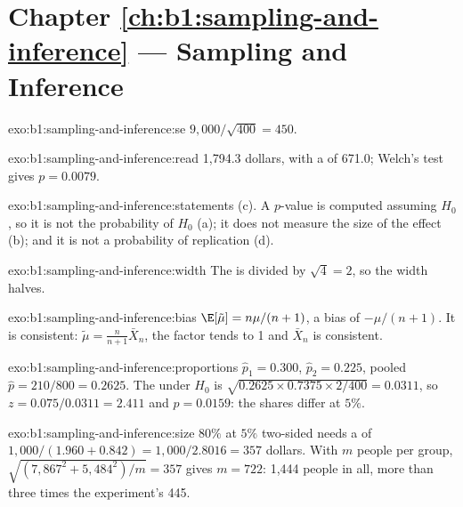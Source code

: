 \section*{Chapter \ref{ch:b1:sampling-and-inference} --- Sampling and Inference}

\begin{solution}{exo:b1:sampling-and-inference:se}
$9{,}000/\sqrt{400} = 450$.
\end{solution}

\begin{solution}{exo:b1:sampling-and-inference:read}
1,794.3 dollars, with a  of 671.0; Welch's test gives $p = 0.0079$.
\end{solution}

\begin{solution}{exo:b1:sampling-and-inference:statements}
(c). A $p$-value is computed assuming $H_0$, so it is not the probability of $H_0$ (a);
it does not measure the size of the effect (b); and it is not a probability
of replication (d).
\end{solution}

\begin{solution}{exo:b1:sampling-and-inference:width}
The  is divided by $\sqrt4 = 2$, so the width halves.
\end{solution}

\begin{solution}{exo:b1:sampling-and-inference:bias}
$\E[\tilde\mu] = n\mu/(n+1)$, a bias of $-\mu/(n+1)$. It is consistent: $\tilde\mu = \frac{n}{n+1}\bar X_n$, the factor
tends to 1 and $\bar X_n$ is consistent.
\end{solution}

\begin{solution}{exo:b1:sampling-and-inference:proportions}
$\hat p_1 = 0.300$, $\hat p_2 = 0.225$, pooled $\hat p = 210/800 = 0.2625$. The  under $H_0$ is
$\sqrt{0.2625 \times 0.7375 \times 2/400} = 0.0311$, so $z = 0.075/0.0311 = 2.411$ and $p = 0.0159$: the shares
differ at $5\%$.
\end{solution}

\begin{solution}{exo:b1:sampling-and-inference:size}
 $80\%$ at $5\%$ two-sided needs a  of $1{,}000/(1.960 + 0.842) = 1{,}000/2.8016 = 357$
dollars. With $m$ people per group, $\sqrt{(7{,}867^2 + 5{,}484^2)/m} = 357$ gives $m = 722$: 1,444 people in
all, more than three times the experiment's 445.
\end{solution}

